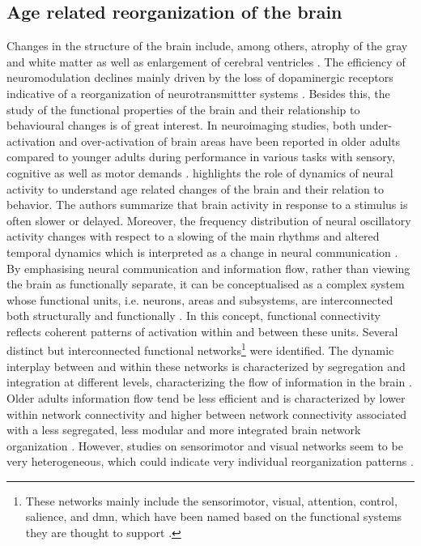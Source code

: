 \subsection{Age related reorganization of the brain}
\label{theory:aging:brain}
Changes in the structure of the brain include, among others, atrophy of the gray and white matter as well as enlargement of cerebral ventricles \cite{Fjell2010}. The efficiency of neuromodulation declines mainly driven by the loss of dopaminergic receptors indicative of a reorganization of neurotransmittter systems \cite{Li2001}. Besides this, the study of the functional properties of the brain and their relationship to behavioural changes is of great interest. In neuroimaging studies, both under-activation and over-activation of brain areas have been reported in older adults compared to younger adults during performance in various tasks with sensory, cognitive as well as motor demands \cite{Reuter-Lorenz2010, Sala-Llonch2015}. \citeauthor{Courtney2021} \cite{Courtney2021} highlights the role of dynamics of neural activity to understand age related changes of the brain and their relation to behavior. The authors summarize that brain activity in response to a stimulus is often slower or delayed. Moreover, the frequency distribution of neural oscillatory activity changes with respect to a slowing of the main rhythms and altered temporal dynamics which is interpreted as a change in neural communication \cite{Courtney2021}.\\ 
By emphasising neural communication and information flow, rather than viewing the brain as functionally separate, it can be conceptualised as a complex system whose functional units, i.e. neurons, areas and subsystems, are interconnected both structurally and functionally \cite{Friston2011,Deery2023}. In this concept, functional connectivity reflects coherent patterns of activation within and between these units. Several distinct but interconnected functional networks\footnote{These networks mainly include the sensorimotor, visual, attention, control, salience, and \gls{dmn}, which have been named based on the functional systems they are thought to support \cite{Uddin2019}.} were identified. The dynamic interplay between and within these networks is characterized by segregation and integration at different levels, characterizing the flow of information in the brain \cite{Sporns2013}. Older adults information flow tend be less efficient and is characterized by lower within network connectivity and higher between network connectivity associated with a less segregated, less modular and more integrated brain network organization \cite{Sala-Llonch2015,Deery2023, Betzel2014}. However, studies on sensorimotor and visual networks seem to be very heterogeneous, which could indicate very individual reorganization patterns \cite{Deery2023}.

